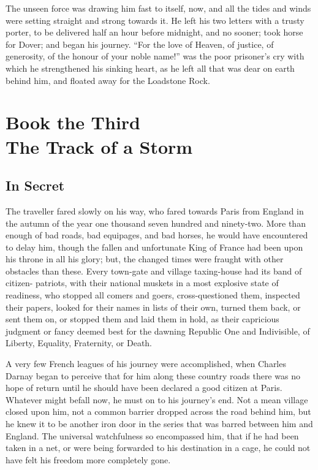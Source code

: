 The unseen force was drawing him fast to itself, now, and all the
tides and winds were setting straight and strong towards it.  He left
his two letters with a trusty porter, to be delivered half an hour
before midnight, and no sooner; took horse for Dover; and began his
journey.  ``For the love of Heaven, of justice, of generosity, of the
honour of your noble name!'' was the poor prisoner's cry with which
he strengthened his sinking heart, as he left all that was dear on
earth behind him, and floated away for the Loadstone Rock.







\cleartorecto
\part{Book the Third\\The Track of a Storm}




\chapter{In Secret}


The traveller fared slowly on his way, who fared towards Paris from
England in the autumn of the year one thousand seven hundred and
ninety-two.  More than enough of bad roads, bad equipages, and bad
horses, he would have encountered to delay him, though the fallen and
unfortunate King of France had been upon his throne in all his glory;
but, the changed times were fraught with other obstacles than these.
Every town-gate and village taxing-house had its band of citizen-%
patriots, with their national muskets in a most explosive state of
readiness, who stopped all comers and goers, cross-questioned them,
inspected their papers, looked for their names in lists of their own,
turned them back, or sent them on, or stopped them and laid them in
hold, as their capricious judgment or fancy deemed best for the
dawning Republic One and Indivisible, of Liberty, Equality,
Fraternity, or Death.

A very few French leagues of his journey were accomplished, when
Charles Darnay began to perceive that for him along these country
roads there was no hope of return until he should have been declared
a good citizen at Paris.  Whatever might befall now, he must on to
his journey's end.  Not a mean village closed upon him, not a common
barrier dropped across the road behind him, but he knew it to be
another iron door in the series that was barred between him and
England.  The universal watchfulness so encompassed him, that if he
had been taken in a net, or were being forwarded to his destination
in a cage, he could not have felt his freedom more completely gone.

